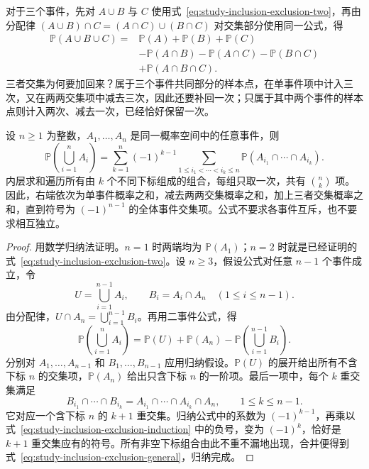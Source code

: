 对于三个事件，先对 $A\cup B$ 与 $C$ 使用式~\eqref{eq:study-inclusion-exclusion-two}，再由分配律 $(A\cup B)\cap C=(A\cap C)\cup(B\cap C)$ 对交集部分使用同一公式，得
\begin{equation}
  \begin{aligned}
    \mathbb P(A\cup B\cup C)
      ={}&\mathbb P(A)+\mathbb P(B)+\mathbb P(C)\\
         &-\mathbb P(A\cap B)-\mathbb P(A\cap C)-\mathbb P(B\cap C)\\
         &+\mathbb P(A\cap B\cap C).
  \end{aligned}
  \label{eq:study-inclusion-exclusion-three}
\end{equation}
三者交集为何要加回来？属于三个事件共同部分的样本点，在单事件项中计入三次，又在两两交集项中减去三次，因此还要补回一次；只属于其中两个事件的样本点则计入两次、减去一次，已经恰好保留一次。

\begin{theorem}[有限个事件的加法定理]
\label{thm:study-inclusion-exclusion}
设 $n\ge1$ 为整数，$A_1,\ldots,A_n$ 是同一概率空间中的任意事件，则
\begin{equation}
  \mathbb P\!\left(\bigcup_{i=1}^{n}A_i\right)
    =\sum_{k=1}^{n}(-1)^{k-1}
      \sum_{1\le i_1<\cdots<i_k\le n}
      \mathbb P(A_{i_1}\cap\cdots\cap A_{i_k}).
  \label{eq:study-inclusion-exclusion-general}
\end{equation}
内层求和遍历所有由 $k$ 个不同下标组成的组合，每组只取一次，共有 $\binom nk$ 项。因此，右端依次为单事件概率之和，减去两两交集概率之和，加上三者交集概率之和，直到符号为 $(-1)^{n-1}$ 的全体事件交集项。公式不要求各事件互斥，也不要求相互独立。
\end{theorem}

\begin{proof}
用数学归纳法证明。$n=1$ 时两端均为 $\mathbb P(A_1)$；$n=2$ 时就是已经证明的式~\eqref{eq:study-inclusion-exclusion-two}。设 $n\ge3$，假设公式对任意 $n-1$ 个事件成立，令
\[
  U=\bigcup_{i=1}^{n-1}A_i,\qquad B_i=A_i\cap A_n\quad(1\le i\le n-1).
\]
由分配律，$U\cap A_n=\bigcup_{i=1}^{n-1}B_i$。再用二事件公式，得
\begin{equation}
  \mathbb P\!\left(\bigcup_{i=1}^{n}A_i\right)
    =\mathbb P(U)+\mathbb P(A_n)
      -\mathbb P\!\left(\bigcup_{i=1}^{n-1}B_i\right).
  \label{eq:study-inclusion-exclusion-induction}
\end{equation}
分别对 $A_1,\ldots,A_{n-1}$ 和 $B_1,\ldots,B_{n-1}$ 应用归纳假设。$\mathbb P(U)$ 的展开给出所有不含下标 $n$ 的交集项，$\mathbb P(A_n)$ 给出只含下标 $n$ 的一阶项。最后一项中，每个 $k$ 重交集满足
\[
  B_{i_1}\cap\cdots\cap B_{i_k}
    =A_{i_1}\cap\cdots\cap A_{i_k}\cap A_n,
  \qquad 1\le k\le n-1.
\]
它对应一个含下标 $n$ 的 $k+1$ 重交集。归纳公式中的系数为 $(-1)^{k-1}$，再乘以式~\eqref{eq:study-inclusion-exclusion-induction} 中的负号，变为 $(-1)^k$，恰好是 $k+1$ 重交集应有的符号。所有非空下标组合由此不重不漏地出现，合并便得到式~\eqref{eq:study-inclusion-exclusion-general}，归纳完成。
\end{proof}

